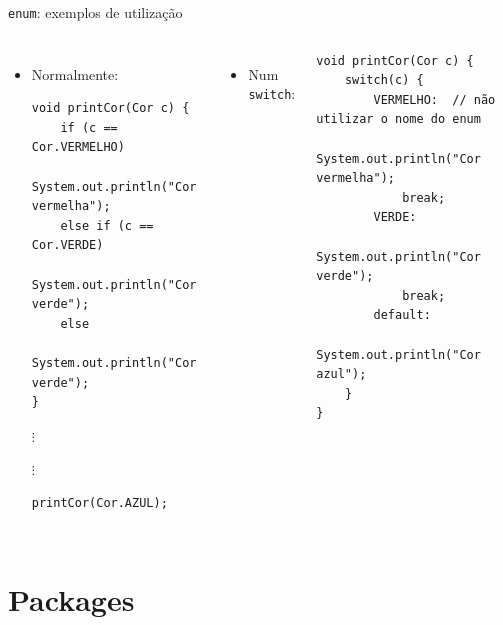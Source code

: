 \documentclass[portuguese, aspectratio=169, xcolor=table]{beamer}
\begin{document}
\begin{frame}[fragile]{\texttt{enum}: exemplos de utilização}
    \scriptsize
\begin{columns}
\begin{itemize}
\item Normalmente:
\begin{verbatim}
void printCor(Cor c) {
    if (c == Cor.VERMELHO)
        System.out.println("Cor vermelha");
    else if (c == Cor.VERDE)
        System.out.println("Cor verde");
    else
        System.out.println("Cor verde");
}
\end{verbatim}
$\vdots$

$\vdots$
\begin{verbatim}
printCor(Cor.AZUL);
\end{verbatim}
\end{itemize}
\begin{itemize}
    \item Num \texttt{switch}:
\end{itemize}
\begin{verbatim}
void printCor(Cor c) {
    switch(c) {
        VERMELHO:  // não utilizar o nome do enum
            System.out.println("Cor vermelha");
            break;
        VERDE:
            System.out.println("Cor verde");
            break;
        default:
            System.out.println("Cor azul");
    }
}
\end{verbatim}
\end{columns}
\end{frame}

\section{Packages}
\end{document}
